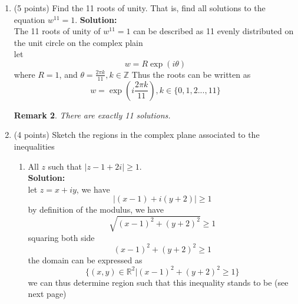 \documentclass[12pt]{article}
\newtheorem*{remark}{Remark}
\begin{document}
\begin{enumerate}
\begin{remark}
    There are exactly 12 solutions.  
\end{remark}

\item (5 points)  Find the 11 roots of unity.  That is, find all solutions to the equation $w^{11} = 1$.  
\textbf{Solution:}\\
The 11 roots of unity of $w^{11}=1$ can be described as 11 evenly distributed on the unit circle on the complex plain\\
let\[
w=R\exp{(i\theta)}
\]
where $R=1$, and $\theta=\frac{2\pi k}{11}, k\in\mathbb{Z}$
Thus the roots can be written as\[
w=\exp{(i\frac{2\pi k}{11})}, k\in\{0,1,2...,11\}
\]
\begin{remark}
    There are exactly 11 solutions.  
\end{remark}

\item (4 points)  Sketch the regions in the complex plane associated to the inequalities 
\begin{enumerate}
    \item All $z$ such that $|z - 1 + 2i| \geq 1$.\\
    \textbf{Solution:}\\
    let $z=x+iy$, we have\[
    |(x-1)+i(y+2)|\geq1
    \]
    by definition of the modulus, we have
    \[
    \sqrt{(x-1)^2+(y+2)^2}\geq1
    \]
    squaring both side
    \[
    (x-1)^2+(y+2)^2 \geq 1
    \]
    the domain can be expressed as\[
    \{(x,y)\in\mathbb{R}^2|(x-1)^2+(y+2)^2 \geq 1\}
    \]
    we can thus determine region such that this inequality stands to be (see next page)\\
    

\end{enumerate}
\end{enumerate}
\end{document}
